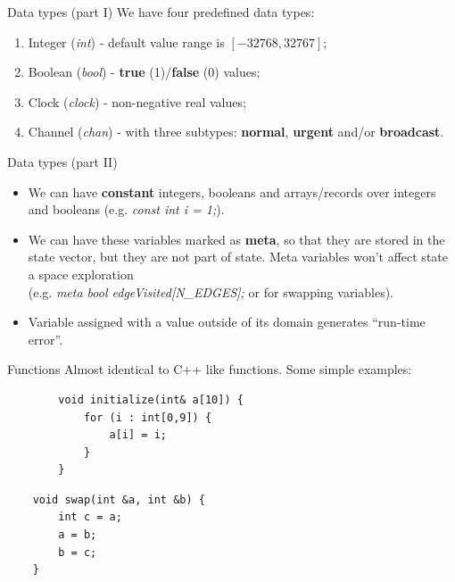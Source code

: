 \documentclass{beamer}
\begin{document}
\begin{frame}{Data types (part I)}
	We have four predefined data types:
	\begin{enumerate}
		\item Integer (\textit{int}) - default value range is $[-32768, 32767]$;
		\item Boolean (\textit{bool}) - \textbf{true} (1)/\textbf{false} (0) values;
		\item Clock (\textit{clock}) - non-negative real values;
		\item Channel (\textit{chan}) - with three subtypes: \textbf{normal}, \textbf{urgent} and/or \textbf{broadcast}.
	\end{enumerate}
\end{frame}

\begin{frame}{Data types (part II)}
	\begin{itemize}
		\item We can have \textbf{constant} integers, booleans and arrays/records over integers and booleans (e.g. \textit{const int i = 1;}).
		\item We can have these variables marked as \textbf{meta}, so that they are stored in the state vector, but they are not part of state. Meta variables won't affect state a space exploration \\ (e.g. \textit{meta bool edgeVisited[N\_EDGES];} or for swapping variables).
		\item Variable assigned with a value outside of its domain generates ``run-time error''.
	\end{itemize}

\end{frame}

\begin{frame}[fragile]{Functions}
	Almost identical to C++ like functions. Some simple examples:
	\small
	\begin{verbatim}
		void initialize(int& a[10]) {
		    for (i : int[0,9]) {
		        a[i] = i;
		    }
		}
	\end{verbatim}
	
	\begin{verbatim}
	void swap(int &a, int &b) {
	    int c = a;
	    a = b;
	    b = c;
	}
	\end{verbatim}
	
\end{frame}
\end{document}
